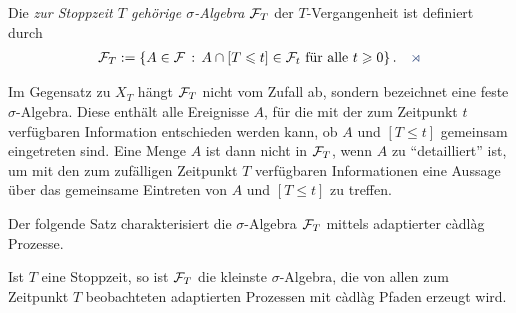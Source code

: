 \begin{defn}
\label{defn:1.10}
Die \emph{zur Stoppzeit $T$ gehörige $\sigma$-Algebra $\mathcal{F}_T$} der
$T$-Vergangenheit ist definiert durch
\begin{align*}
\FF_T \defl \setdef*{A \in \FF}{A \cap [T \le t] \in \FF_t\text{ für alle }t\ge
0}.\fish
\end{align*}
\end{defn}

Im Gegensatz zu $X_T$ hängt $\mathcal{F}_T$ nicht vom Zufall ab, sondern bezeichnet
eine feste $\sigma$-Algebra. Diese enthält alle Ereignisse $A$, für die mit der 
zum Zeitpunkt $t$ verfügbaren Information entschieden werden kann, ob $A$ und
$[T\le t]$ gemeinsam eingetreten sind. Eine Menge $A$ ist dann nicht in
$\mathcal{F}_T$, wenn $A$ zu "`detailliert"' ist, um mit den zum zufälligen Zeitpunkt
$T$ verfügbaren Informationen eine Aussage über das gemeinsame Eintreten von $A$
und $[T\le t]$ zu treffen.



Der folgende Satz charakterisiert die $\sigma$-Algebra $\mathcal{F}_T$ mittels
adaptierter càdlàg Prozesse.

\begin{prop}
\label{prop:1.12}
Ist $T$ eine Stoppzeit, so ist $\mathcal{F}_T$ die kleinste $\sigma$-Algebra, die von
allen zum Zeitpunkt $T$ beobachteten adaptierten Prozessen mit càdlàg Pfaden
erzeugt wird.\fish
\end{prop}

